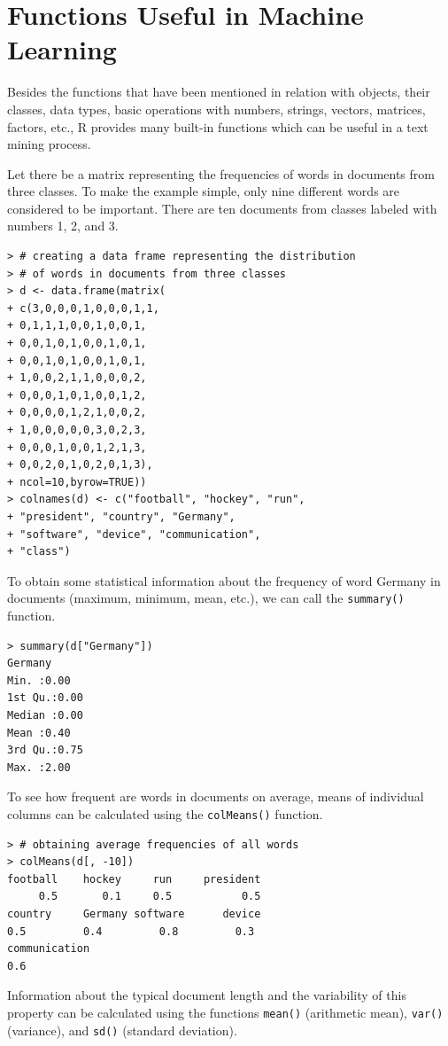 \section{Functions Useful in Machine Learning}

Besides the functions that have been mentioned in relation with objects, their
classes, data types, basic operations with numbers, strings, vectors, matrices,
factors, etc., R provides many built-in functions which can be useful in a text
mining process.

Let there be a matrix representing the frequencies of words in documents
from three classes. To make the example simple, only nine different words are
considered to be important. There are ten documents from classes labeled with
numbers 1, 2, and 3.

\begin{verbatim}
> # creating a data frame representing the distribution
> # of words in documents from three classes
> d <- data.frame(matrix(
+ c(3,0,0,0,1,0,0,0,1,1,
+ 0,1,1,1,0,0,1,0,0,1,
+ 0,0,1,0,1,0,0,1,0,1,
+ 0,0,1,0,1,0,0,1,0,1,
+ 1,0,0,2,1,1,0,0,0,2,
+ 0,0,0,1,0,1,0,0,1,2,
+ 0,0,0,0,1,2,1,0,0,2,
+ 1,0,0,0,0,0,3,0,2,3,
+ 0,0,0,1,0,0,1,2,1,3,
+ 0,0,2,0,1,0,2,0,1,3),
+ ncol=10,byrow=TRUE))
> colnames(d) <- c("football", "hockey", "run",
+ "president", "country", "Germany",
+ "software", "device", "communication",
+ "class")
\end{verbatim}

To obtain some statistical information about the frequency of word Germany
in documents (maximum, minimum, mean, etc.), we can call the \texttt{summary()}
function.

\begin{verbatim}
> summary(d["Germany"])
Germany
Min. :0.00
1st Qu.:0.00
Median :0.00
Mean :0.40
3rd Qu.:0.75
Max. :2.00
\end{verbatim}

To see how frequent are words in documents on average, means of individual
columns can be calculated using the \texttt{colMeans()} function.

\begin{verbatim}
> # obtaining average frequencies of all words
> colMeans(d[, -10])
football    hockey     run     president
     0.5       0.1     0.5           0.5
country     Germany software      device
0.5         0.4         0.8         0.3
communication
0.6
\end{verbatim}  

Information about the typical document length and the variability of this
property can be calculated using the functions \texttt{mean()} (arithmetic mean), 
\texttt{var()} (variance), and \texttt{sd()} (standard deviation).

